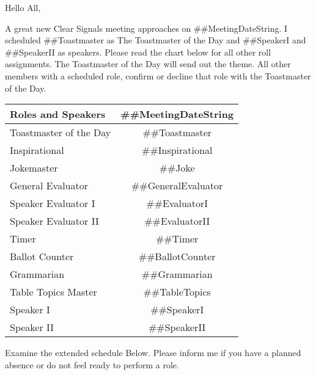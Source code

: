 \documentclass{article}
\newcommand{\meetingDateString}{##MeetingDateString}
\newcommand{\toastmaster}{##Toastmaster}
\newcommand{\tableTopics}{##TableTopics}
\newcommand{\generalEvaluator}{##GeneralEvaluator}
\newcommand{\evaluatorI}{##EvaluatorI}
\newcommand{\evaluatorII}{##EvaluatorII}
\newcommand{\speakerI}{##SpeakerI}
\newcommand{\speakerII}{##SpeakerII}
\newcommand{\grammarian}{##Grammarian}
\newcommand{\timer}{##Timer}
\newcommand{\inspirational}{##Inspirational}
\newcommand{\ballotCounter}{##BallotCounter}
\newcommand{\joke}{##Joke}
\begin{document}
 Hello All,
 
   A great new Clear Signals meeting approaches on \meetingDateString{}.  I scheduled \toastmaster{} as The Toastmaster of the Day and \speakerI{} and \speakerII{} as speakers.  Please read the chart below for all other roll assignments.  The Toastmaster of the Day will send out the theme.  All other members with a scheduled role, confirm or decline that role with the Toastmaster of the Day.   

  \begin{tabular}{ |l|c| }
    \hline
    Roles and Speakers & \meetingDateString{} \\
    \hline
    Toastmaster of the Day & \toastmaster{} \\
    \hline
    Inspirational & \inspirational{} \\
    \hline
    Jokemaster & \joke{} \\
    \hline
    General Evaluator & \generalEvaluator{} \\
    \hline
    Speaker Evaluator I & \evaluatorI{} \\
    \hline
    Speaker Evaluator II & \evaluatorII{} \\
    \hline
    Timer & \timer{} \\
    \hline
    Ballot Counter & \ballotCounter{} \\
    \hline
    Grammarian & \grammarian{} \\
    \hline
    Table Topics Master & \tableTopics{} \\
    \hline\hline
    Speaker I & \speakerI{} \\
    \hline
    Speaker II & \speakerII{} \\
    \hline
  \end{tabular}
  
  Examine the extended schedule Below.  Please inform me if you have a planned absence or do not feel ready to perform a role. 
  
\end{document}

